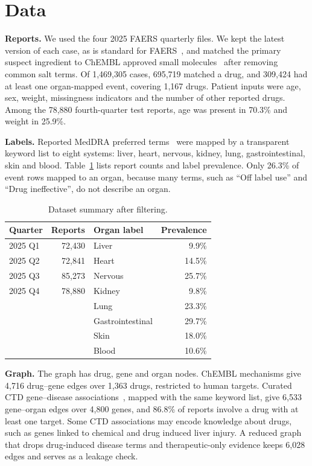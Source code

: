 \documentclass[conference,letterpaper]{IEEEtran}
\begin{document}
\section{Data}
\textbf{Reports.} We used the four 2025 FAERS quarterly files. We kept the latest version of each case, as is standard for FAERS~\cite{sakaeda2013}, and matched the primary suspect ingredient to ChEMBL approved small molecules~\cite{zdrazil2024} after removing common salt terms. Of 1,469,305 cases, 695,719 matched a drug, and 309,424 had at least one organ-mapped event, covering 1,167 drugs. Patient inputs were age, sex, weight, missingness indicators and the number of other reported drugs. Among the 78,880 fourth-quarter test reports, age was present in 70.3\% and weight in 25.9\%.

\textbf{Labels.} Reported MedDRA preferred terms~\cite{brown1999} were mapped by a transparent keyword list to eight systems: liver, heart, nervous, kidney, lung, gastrointestinal, skin and blood. Table~\ref{tab:data} lists report counts and label prevalence. Only 26.3\% of event rows mapped to an organ, because many terms, such as ``Off label use'' and ``Drug ineffective'', do not describe an organ.

\begin{table}[t]
\centering
\caption{Dataset summary after filtering.}
\label{tab:data}
\footnotesize
\begin{tabular}{lrlr}
\toprule
Quarter & Reports & Organ label & Prevalence \\
\midrule
2025 Q1 & 72,430 & Liver & 9.9\% \\
2025 Q2 & 72,841 & Heart & 14.5\% \\
2025 Q3 & 85,273 & Nervous & 25.7\% \\
2025 Q4 & 78,880 & Kidney & 9.8\% \\
 & & Lung & 23.3\% \\
 & & Gastrointestinal & 29.7\% \\
 & & Skin & 18.0\% \\
 & & Blood & 10.6\% \\
\bottomrule
\end{tabular}
\end{table}

\textbf{Graph.} The graph has drug, gene and organ nodes. ChEMBL mechanisms give 4,716 drug--gene edges over 1,363 drugs, restricted to human targets. Curated CTD gene--disease associations~\cite{davis2023}, mapped with the same keyword list, give 6,533 gene--organ edges over 4,800 genes, and 86.8\% of reports involve a drug with at least one target. Some CTD associations may encode knowledge about drugs, such as genes linked to chemical and drug induced liver injury. A reduced graph that drops drug-induced disease terms and therapeutic-only evidence keeps 6,028 edges and serves as a leakage check.
\end{document}
